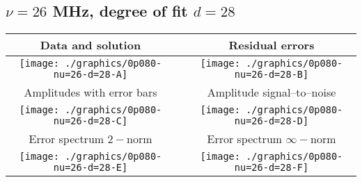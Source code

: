 

% 

\clearpage{}
\break{}

\subsection{$\nu = 26$ MHz, degree of fit $d = 28$}

\begin{table}[h]
    \begin{center}
        \begin{tabular}{ccc}
            Data and solution & \quad & Residual errors \\\hline
            \texttt{[image: ./graphics/0p080-nu=26-d=28-A]} &&
            \texttt{[image: ./graphics/0p080-nu=26-d=28-B]} \\[15pt]
            Amplitudes with error bars && Amplitude signal--to--noise \\\hline
            \texttt{[image: ./graphics/0p080-nu=26-d=28-C]} &&
            \texttt{[image: ./graphics/0p080-nu=26-d=28-D]} \\[15pt]
            Error spectrum $2-$norm && Error spectrum $\infty-$norm \\\hline
            \texttt{[image: ./graphics/0p080-nu=26-d=28-E]} &&
            \texttt{[image: ./graphics/0p080-nu=26-d=28-F]} \\[15pt]
        \end{tabular}
    \end{center}
\label{fig:elev=80, nu=26}
\end{table}



\endinput

